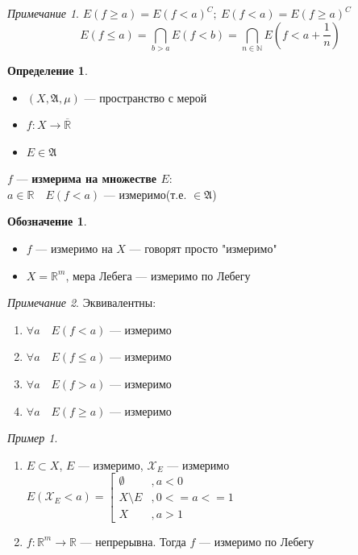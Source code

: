 \documentclass[oneside]{book}
\newcommand{\R}{\mathbb{R}}
\newcommand{\N}{\mathbb{N}}
\newcommand{\A}{\mathfrak{A}}
\theoremstyle{plain}
\theoremstyle{remark}
\newtheorem*{remark}{Примечание}
\newtheorem*{examp}{Пример}
\theoremstyle{definition}
\newtheorem*{definition}{Определение}
\newtheorem*{symb}{Обозначение}
\begin{document}
\begin{remark}
\(E(f \ge a) = E(f < a)^C;\ E(f < a) = E(f \ge a)^C\) \\
\[ E(f \le a) = \bigcap_{b > a} E(f < b) = \bigcap_{n \in \N}E(f < a + \frac{1}{n})\]
\label{org0cc7fd5}
\end{remark}
\begin{definition}
\-
\begin{itemize}
\item \((X, \A, \mu)\) --- пространство с мерой
\item \(f: X \to \overline{\R}\)
\item \(E \in \A\)
\end{itemize}
\(f\) --- \textbf{измерима на множестве \(E\)}: \\
\(a \in \R\quad E(f < a)\) --- измеримо(т.е. \(\in \A\))
\label{org1633e73}
\end{definition}
\begin{symb}
\-
\begin{itemize}
\item \(f\) --- измеримо на \(X\) --- говорят просто "измеримо"
\item \(X = \R^m\), мера Лебега --- измеримо по Лебегу
\end{itemize}
\label{orga767443}
\end{symb}
\begin{remark}
Эквивалентны:
\begin{enumerate}
\item \(\forall a\quad E(f < a)\) --- измеримо
\item \(\forall a\quad E(f \le a)\) --- измеримо
\item \(\forall a\quad E(f > a)\) --- измеримо
\item \(\forall a\quad E(f \ge a)\) --- измеримо
\end{enumerate}
\label{org5628d96}
\end{remark}
\begin{examp}
\begin{enumerate}
\item \(E \subset X\), \(E\) --- измеримо, \(\mathcal{X}_E\) --- измеримо \\
\(E(\mathcal{X}_E < a) = \left[\begin{array}{ll} \emptyset & ,a < 0 \\ X \setminus E & ,0 <= a <= 1 \\ X & ,a > 1 \end{array}\)
\item \(f: \R^m \to \R\) --- непрерывна. Тогда \(f\) --- измеримо по Лебегу
\end{enumerate}
\label{org83940e3}
\end{examp}
\end{document}
